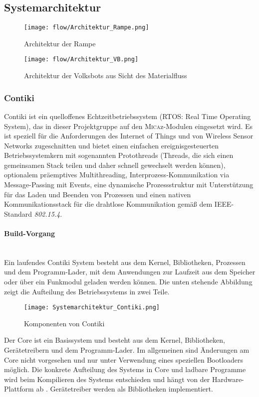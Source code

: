 \subsection{Systemarchitektur}

\begin{figure}[h!]
 \centering
		\texttt{[image: flow/Architektur\_Rampe.png]}
	\caption{Architektur der Rampe \cite{Stasch:Hahn}}
	\label{ArchitekturMicazRampe}
\end{figure}

\begin{figure}[h!]
 \centering
		\texttt{[image: flow/Architektur\_VB.png]}
	\caption{Architektur der Volksbots aus Sicht des Materialfluss \cite{Stasch:Hahn}}
	\label{ArchitekturMicazVB}
\end{figure}

\subsubsection{Contiki}
Contiki ist ein quelloffenes Echtzeitbetriebssystem (RTOS: Real Time Operating System), das in dieser Projektgruppe auf den \textsc{Mica}z-Modulen eingesetzt wird. Es ist speziell für die Anforderungen des Internet of Things und von Wireless Sensor Networks zugeschnitten und bietet einen einfachen ereignisgesteuerten Betriebssystemkern mit sogenannten Protothreads (Threads, die sich einen gemeinsamen Stack teilen und daher schnell gewechselt werden können), optionalem präemptives Multithreading, Interprozess-Kommunikation via Message-Passing mit Events, eine dynamische Prozessstruktur mit Unterstützung für das Laden und Beenden von Prozessen und einen nativen Kommunikationsstack für die drahtlose Kommunikation gemäß dem IEEE-Standard \textit{802.15.4}.
 
\paragraph{Build-Vorgang}\mbox{}\\
Ein laufendes Contiki System besteht aus dem Kernel, Bibliotheken, Prozessen und dem Programm-Lader, mit dem Anwendungen zur Laufzeit aus dem Speicher oder \"uber ein Funkmodul geladen werden k\"onnen.
Die unten stehende Abbildung zeigt die Aufteilung des Betriebssystems in zwei Teile. 
\begin{figure}[h!]
	\centering
		\texttt{[image: Systemarchitektur\_Contiki.png]}
	\caption{Komponenten von Contiki \cite{Dunkels:Groenvall:Voigt:2014:Online}}
	\label{Systemarchitektur von Contiki}
\end{figure}
Der Core ist ein Basissystem und besteht aus dem Kernel, Bibliotheken, Ger\"{a}tetreibern und dem Programm-Lader. 
Im allgemeinen sind \"Anderungen am Core nicht vorgesehen und nur unter Verwendung eines speziellen Bootloaders m\"oglich. 
Die konkrete Aufteilung des Systems in Core und ladbare Programme wird beim Kompilieren des Systems entschieden und h\"angt 
von der Hardware-Plattform ab \cite[vgl.][S. 7]{Walter:2010}. Ger\"atetreiber werden als Bibliotheken implementiert. 

